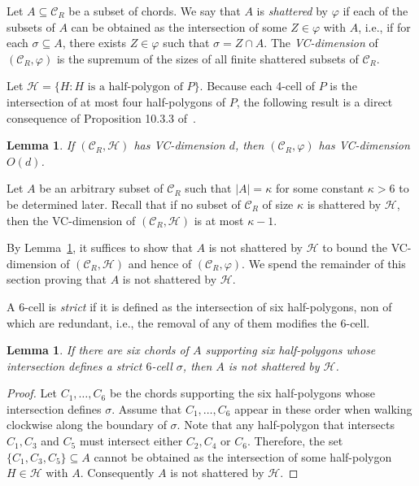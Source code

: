 \documentclass[a4paper]{article}
\newtheorem{lemma}[theorem]{Lemma}
\newcommand{\tcell}{4-cell\xspace}
\newcommand{\C}{\ensuremath{{\mathcal C_R}}}
\begin{document}
Let $A \subseteq \C$ be a subset of chords.
We say that $A$ is \emph{shattered} by $\varphi$ if each of the subsets of $A$ can be obtained as the intersection of some $Z\in \varphi$ with $A$, i.e., if for each $\sigma\subseteq A$, there exists $Z\in \varphi$ such that $\sigma = Z\cap A$. 
The \emph{VC-dimension} of $(\C, \varphi)$ is the supremum of the sizes of all finite shattered subsets of $\C$.

Let $\mathcal H = \{H : H\text{ is a half-polygon of }P\}$.
Because each \tcell of $P$ is the intersection of at most four half-polygons of $P$,
the following result is a direct consequence of Proposition 10.3.3 of~\cite[Chapter 10]{matouvsek2002lectures}.

\begin{lemma}\label{lemma:Shattering}
If $(\C, \mathcal H)$ has VC-dimension $d$, then $(\C, \varphi)$ has VC-dimension $O(d)$.
\end{lemma}

Let $A$ be an arbitrary subset of $\C$ such that $|A| = \kappa$ for some constant $\kappa >6$ to be determined later.
Recall that if no subset of $\C$ of size $\kappa$ is shattered by $\mathcal H$, then the VC-dimension of $(\C, \mathcal H)$ is at most $\kappa-1$.

By Lemma~\ref{lemma:Shattering}, it suffices to show that $A$ is not shattered by $\mathcal H$ to bound the VC-dimension of $(\C, \mathcal H)$ and hence of $(\C, \varphi)$.
We spend the remainder of this section proving that $A$ is not shattered by $\mathcal H$.

 A $6$-cell is \emph{strict} if it is defined as the intersection of six half-polygons, non of which are redundant, i.e., the removal of any of them modifies the $6$-cell.

\begin{lemma}\label{lemma:Hexagonal face}
If there are six chords of $A$ supporting six half-polygons whose intersection defines a strict $6$-cell $\sigma$,
then $A$ is not shattered by $\mathcal H$.
\end{lemma}
\begin{proof}
Let $C_1, \ldots, C_6$ be the chords supporting the six half-polygons whose intersection defines $\sigma$. Assume that $C_1, \ldots, C_6$ appear in these order when walking clockwise along the boundary of $\sigma$.
Note that any half-polygon that intersects $C_1, C_3$ and $C_5$ must intersect either $C_2, C_4$ or $C_6$. 
Therefore, the set $\{C_1, C_3, C_5\}\subseteq A$ cannot be obtained as the intersection of some half-polygon $H\in \mathcal H$ with $A$. 
Consequently $A$ is not shattered by $\mathcal H$.
\end{proof}
\end{document}
